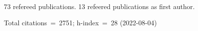 73 refereed publications. 13 refeered publications as first author.

Total citations~=~2751; h-index~=~28 (2022-08-04)